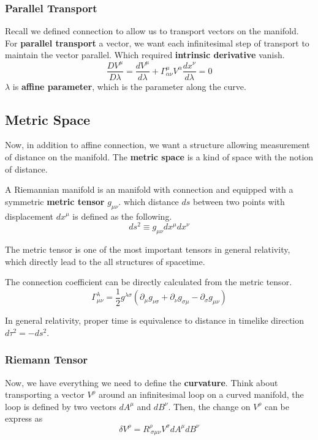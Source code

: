 \documentclass[12pt]{article}
\theoremstyle{mystyle}{\newtheorem{definition}{Definition}[section]}
\theoremstyle{mystyle}{\newtheorem{theorem}[definition]{Theorem}}
\theoremstyle{mystyle}{\newtheorem*{remark}{Remark}}
\theoremstyle{mystyle}{\newtheorem*{example}{Example}}
\theoremstyle{mystyle}{\newtheorem*{examples}{Examples}}
\theoremstyle{cstyle}{\newtheorem*{cthm}{}}
\begin{document}
\subsubsection{Parallel Transport}
Recall we defined connection to allow us to transport vectors on the manifold.
For \textbf{parallel transport} a vector, we want each infinitesimal step of transport to maintain the vector parallel.
Which required \textbf{intrinsic derivative} vanish.\[\frac{DV^{\mu}}{D\lambda} =
  \frac{dV^{\mu}}{d\lambda}+ \Gamma^{\mu}_{\alpha\nu}V^{\alpha}\frac{dx^{\nu}}{d\lambda} = 0\]
\(\lambda\) is \textbf{affine parameter}, which is the parameter along the curve.

\subsection{Metric Space}
Now, in addition to affine connection, we want a structure allowing measurement of distance on the manifold.
The \textbf{metric space} is a kind of space with the notion of distance.
\begin{definition}
  A Riemannian manifold is an manifold with connection and equipped with a symmetric \textbf{metric tensor} \(g_{\mu\nu}\).
  which distance \(ds\) between two points with displacement \(dx^{\mu}\) is defined as the following.
  \[ds^2 \equiv g_{\mu \nu} dx^{\mu} dx^{\nu}\]
\end{definition}
The metric tensor is one of the most important tensors in general relativity,
which directly lead to the all structures of spacetime.
\begin{example}
  The connection coefficient can be directly calculated from the metric tensor.
  \[\Gamma_{\mu\nu}^{\lambda} = \frac{1}{2}g^{\lambda\sigma}(\partial_{\mu}g_{\nu\sigma}+ \partial_{\nu}g_{\sigma\mu}
    - \partial_{\sigma}g_{\mu\nu})\]
\end{example}
In general relativity, proper time is equivalence to distance in timelike direction \(d\tau^2 = - ds^2\).

\subsubsection{Riemann Tensor}
Now, we have everything we need to define the \textbf{curvature}. Think about transporting a vector \(V^\rho\)
around an infinitesimal loop on a curved manifold, the loop is defined by two vectors \(dA^\mu\) and \(dB^\nu\).
Then, the change on \(V^\rho\) can be express as \[\delta V^\rho = R^{\rho}_{\ \sigma\mu\nu}V^{\sigma}dA^{\mu}dB^{\nu}\]
\end{document}

